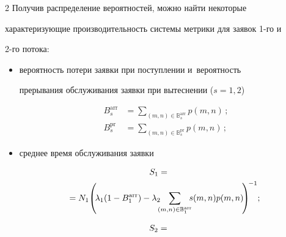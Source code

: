 \begin{multicols}{2}
  Получив распределение вероятностей, можно найти некоторые 


характеризующие производительность системы метрики для заявок 1-го и 


2-го потока:


  \begin{itemize}


  \item вероятность потери заявки при поступлении и~вероятность 


прерывания обслуживания заявки при вытеснении ($s=1, 2$)


  \begin{align*}


  B_s^{\mathrm{arr}}&=\sum\limits_{(m,n)\in \mathbb{B}_s^{\mathrm{arr}}} p(m,n)\,;\\


  B_s^{\mathrm{pr}}&=\sum\limits_{(m,n)\in \mathbb{B}_s^{\mathrm{pr}}} p(m,n)\,;


  \end{align*}


\item среднее время обслуживания заявки


\begin{multline*}


\hspace*{-15pt}S_1={}\\


\hspace*{-15pt}{}={N_1} \!\left(\!\lambda_1(1-B_1^{\mathrm{arr}})- %


\lambda_2\!\!\! \sum\limits_{(m,n)\in \mathbb{B}_1^{\mathrm{arr}}}\!\!\! 


s(m,n)p(m,n)\!\right)^{\!-1}\!;\hspace*{-9pt}


\end{multline*}





\vspace*{-12pt}





\noindent


\begin{multline*}


\hspace*{-15pt}S_2={}\\



\end{multline*}
\end{itemize}
\end{multicols}
